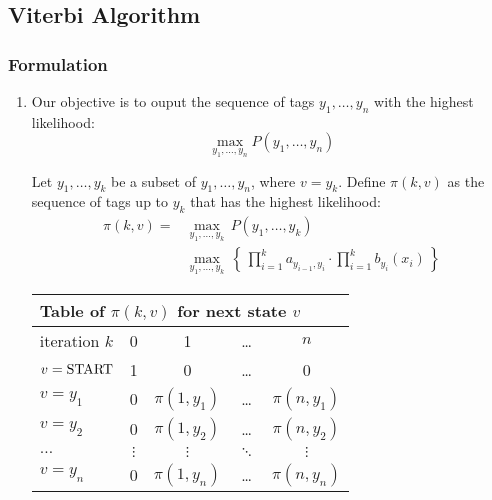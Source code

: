 \documentclass[9pt,twocolumn]{article}
\newcommand{\START}{\text{\lstinline{START}}}
\newcommand{\STOP}{\text{\lstinline{STOP}}}
\begin{document}
    \subsection*{Viterbi Algorithm}
        \subsubsection*{Formulation}
            \begin{enumerate}
            \item
                Our objective is to ouput the sequence of tags $y_1, \ldots, y_n$ with the highest likelihood:
                \begin{equation}
                    \max_{y_1, \ldots, y_n} P(y_1, \ldots, y_n)
                \end{equation}

                Let $y_1, \ldots, y_k$ be a subset of $y_1, \ldots, y_n$, where $v=y_k$. Define $\pi(k,v)$ as the sequence of tags up to $y_k$ that has the highest likelihood:
                \begin{equation}
                \begin{split}
                    \pi(k,v) = & \max_{y_1, \ldots, y_k}\, P(y_1, \ldots, y_k) \\
                               & \max_{y_1, \ldots, y_k}\, \left\{{{\, \prod^k_{i=1} a_{y_{i-1}, y_i} \cdot \prod^k_{i=1}b_{y_i}(x_i)\,}}\right\}
                \end{split}
                \end{equation}

                \begin{center}
                    \begin{tabular}{lcccc} 
                        \toprule
                        \multicolumn{5}{l}{\bfseries Table of $\pi(k,v)$ for next state $v$}\\
                        \midrule
                        iteration $k$ & 0 & 1 & \ldots & $n$ \\
                        \cmidrule(lr){1-5}
                        $v=\START$ & 1 & 0 & \ldots & 0\\
                        $v=y_1$ & 0 & $\pi(1,y_1)$ & \ldots & $\pi(n,y_1)$ \\
                        $v=y_2$ & 0 & $\pi(1,y_2)$ & \ldots & $\pi(n,y_2)$\\
                        $\dots$ & $\vdots$ & $\vdots$ & $\ddots$ & $\vdots$\\
                        $v=y_n$ & 0 & $\pi(1,y_n)$ & \ldots & $\pi(n,y_n)$\\
                        \bottomrule
                    \end{tabular}
                \end{center}


\end{enumerate}
\end{document}
